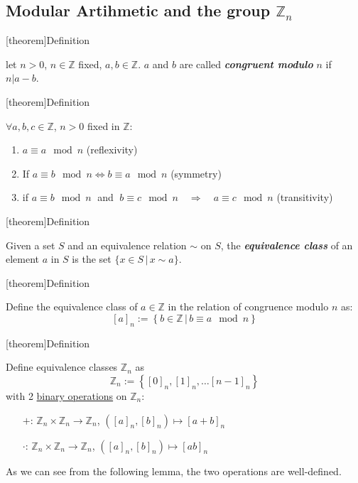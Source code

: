 \documentclass[12pt]{report}
\theoremstyle{definition}
\begin{document}
\subsection{Modular Artihmetic and the group $\mathbb{Z}_n$}

[theorem]{Definition}
\begin{congruent modulo n}
    let $n > 0$, $n \in \mathbb{Z}$ fixed, $a,b \in \mathbb{Z}$. 
    $a$ and $b$ are called \textbf{\emph{congruent modulo}} $n$ if $n | a - b$.
\end{congruent modulo n}

[theorem]{Definition}
\begin{modular arithmetic}
    $\forall a, b, c \in \mathbb{Z}$, $n > 0$ fixed in $\mathbb{Z}$:
    \begin{enumerate}[label = (\arabic*)]
        \item $a \equiv a \mod n$ (reflexivity)
        \item If $a \equiv b \mod n \iff b \equiv a \mod n$ (symmetry)
        \item if $a \equiv b \mod n \;$ and $\;b \equiv c \mod n \quad \Longrightarrow \quad  a \equiv c \mod n$ (transitivity)
    \end{enumerate}
    
\end{modular arithmetic}

[theorem]{Definition}
\begin{equivalence class}
    Given a set $S$ and an equivalence relation $\sim$ on $S$, the \textbf{\emph{equivalence class}}
    of an element $a$ in $S$ is the set $\{x \in S \,|\, x \sim a\}$.
\end{equivalence class}


[theorem]{Definition}
\begin{equivalence classes}
    Define the equivalence class of $a \in \mathbb{Z}$ in the relation of congruence modulo $n$ as:\[
        {[a]}_n := \left\{ b \in \mathbb{Z} \,|\, b \equiv a \mod n \right\} 
    \]
\end{equivalence classes}

[theorem]{Definition}
\begin{group Zn}
    Define equivalence classes $\mathbb{Z}_n$ as\[
        \mathbb{Z}_n := \left\{{[0]}_n, {[1]}_n, \ldots {[n-1]}_n\right\} 
    \] with 2 \underline{binary operations} on $\mathbb{Z}_n$:
    \begin{itemize}
        \item[$+$:] $\mathbb{Z}_n \times \mathbb{Z}_n \rightarrow \mathbb{Z}_n$, 
            $({[a]}_{n}, {[b]}_{n}) \mapsto {[a + b]}_{n}$
        \item[$\cdot$:] $\mathbb{Z}_n \times \mathbb{Z}_n \rightarrow \mathbb{Z}_n$,
            $({[a]}_{n}, {[b]}_{n}) \mapsto {[ab]}_{n}$
    \end{itemize}
    As we can see from the following lemma, the two operations are well-defined.
\end{group Zn}
\end{document}
